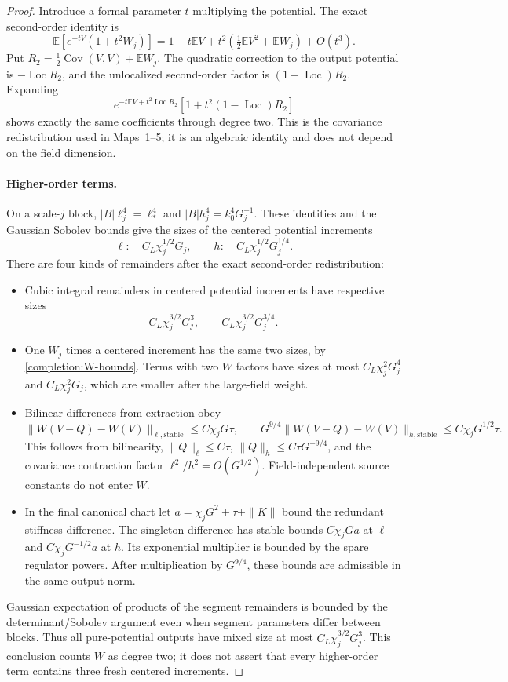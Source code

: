 \documentclass[11pt]{article}
\begin{document}
\begin{proof}
Introduce a formal parameter \(t\) multiplying the potential. The exact
second-order identity is
\[
 \mathbb E[e^{-tV}(1+t^2W_j)]
 =1-t\mathbb EV+t^2\left(\tfrac12\mathbb EV^2+\mathbb EW_j\right)
       +O(t^3).
\]
Put \(R_2=\tfrac12\operatorname{Cov}(V,V)+\mathbb EW_j\).
The quadratic correction to the output potential is
\(-\operatorname{Loc}R_2\), and the unlocalized second-order factor is
\((1-\operatorname{Loc})R_2\). Expanding
\[
 e^{-t\mathbb EV+t^2\operatorname{Loc}R_2}
       [1+t^2(1-\operatorname{Loc})R_2]
\]
shows exactly the same coefficients through degree two. This is the
covariance redistribution used in Maps~1--5; it is an algebraic identity
and does not depend on the field dimension.

\paragraph{Higher-order terms.}
On a scale-\(j\) block, \(|B|\ell_j^4=\ell_*^4\) and
\(|B|h_j^4=k_0^4G_j^{-1}\). These identities and the Gaussian
Sobolev bounds give the sizes of the centered potential increments
\[
 \ell:\quad C_L\chi_j^{1/2}G_j,\qquad
 h:\quad C_L\chi_j^{1/2}G_j^{1/4}.
\]
There are four kinds of remainders after the exact second-order
redistribution:
\begin{itemize}
\item Cubic integral remainders in centered potential increments have
respective sizes
\[
 C_L\chi_j^{3/2}G_j^3,\qquad C_L\chi_j^{3/2}G_j^{3/4}.
\]
\item One \(W_j\) times a centered increment has the same two sizes,
by \eqref{completion:W-bounds}. Terms with two \(W\) factors have
sizes at most \(C_L\chi_j^2G_j^4\) and
\(C_L\chi_j^2G_j\), which are smaller after the large-field weight.
\item Bilinear differences from extraction obey
\[
 \|W(V-Q)-W(V)\|_{\ell,\mathrm{stable}}
       \le C\chi_jG\tau,\qquad
 G^{9/4}\|W(V-Q)-W(V)\|_{h,\mathrm{stable}}
       \le C\chi_jG^{1/2}\tau.
\]
This follows from bilinearity, \(\|Q\|_\ell\le C\tau\),
\(\|Q\|_h\le C\tau G^{-9/4}\), and the covariance contraction
factor \(\ell^2/h^2=O(G^{1/2})\). Field-independent source constants
do not enter \(W\).
\item In the final canonical chart let
\(a=\chi_jG^2+\tau+\|K\|\) bound the redundant stiffness difference.
The singleton difference has stable bounds
\(C\chi_jGa\) at \(\ell\) and
\(C\chi_jG^{-1/2}a\) at \(h\). Its exponential multiplier is bounded
by the spare regulator powers. After multiplication by \(G^{9/4}\),
these bounds are admissible in the same output norm.
\end{itemize}
Gaussian expectation of products of the segment remainders is bounded
by the determinant/Sobolev argument even when segment parameters differ
between blocks. Thus all pure-potential outputs have mixed size at most
\(C_L\chi_j^{3/2}G_j^3\). This conclusion counts \(W\) as degree two;
it does not assert that every higher-order term contains three fresh
centered increments.


\end{proof}
\end{document}
